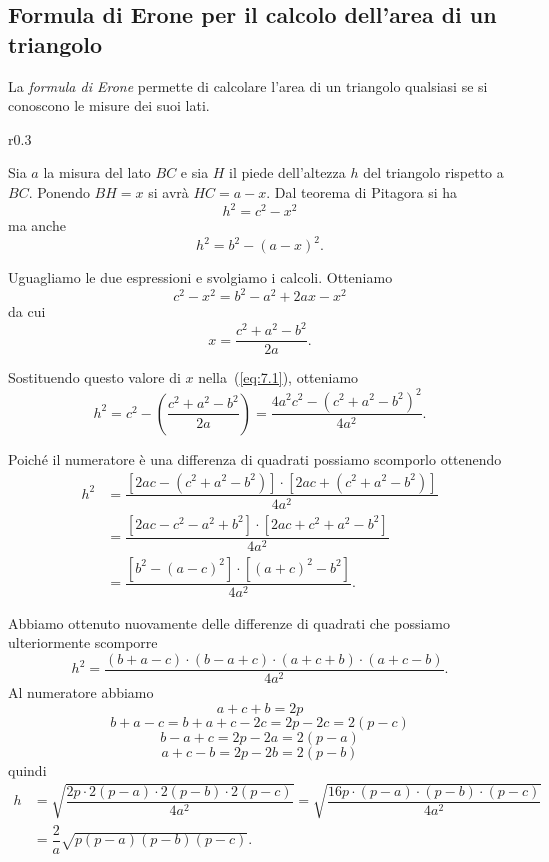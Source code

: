 \subsection{Formula di Erone per il calcolo dell'area di un triangolo}

La \emph{formula di Erone} permette di calcolare l'area di un triangolo qualsiasi se si conoscono le misure dei suoi lati.

\begin{wrapfigure}{r}{0.3\textwidth}
	\centering
	\vspace{10pt}
\end{wrapfigure}
Sia $a$ la misura del lato $BC$ e sia $H$ il piede dell'altezza $h$ del triangolo rispetto a $BC$. Ponendo $BH = x$ si avrà $HC = a - x$.
Dal teorema di Pitagora si ha
\begin{equation}\label{eq:7.1}
h^2=c^2-x^2
\end{equation}
ma anche
\[h^2=b^2-(a-x)^2.\]

Uguagliamo le due espressioni e svolgiamo i calcoli. Otteniamo
\[c^2-x^2=b^2-a^2+2ax-x^2\]
da cui
\[x=\dfrac{c^2+a^2-b^2}{2a}.\]

Sostituendo questo valore di $x$ nella~(\ref{eq:7.1}), otteniamo
\[h^2=c^2-\left(\dfrac{c^2+a^2-b^2}{2a}\right)=\dfrac{4a^2c^2-\left(c^2+a^2-b^2\right)^2}{4a^2}.\]

Poiché il numeratore è una differenza di quadrati possiamo scomporlo ottenendo
\begin{align*}
h^2&=\dfrac{\left[2ac-\left(c^2+a^2-b^2\right)\right]\cdot\left[2ac+\left(c^2+a^2-b^2\right)\right]}{4a^2}\\
&=\dfrac{\left[2ac-c^2-a^2+b^2\right]\cdot\left[2ac+c^2+a^2-b^2\right]}{4a^2}\\
&=\dfrac{\left[b^2-(a-c)^2\right]\cdot\left[(a+c)^2-b^2\right]}{4a^2}.
\end{align*}

Abbiamo ottenuto nuovamente delle differenze di quadrati che possiamo ulteriormente scomporre
\[h^2=\dfrac{(b+a-c)\cdot(b-a+c)\cdot(a+c+b)\cdot(a+c-b)}{4a^2}.\]
Al numeratore abbiamo
\[a + c + b = 2p\]
\[b + a - c = b+a+c-2c = 2p-2c = 2(p-c)\]
\[b - a + c = 2p - 2a = 2 (p - a)\]
\[a + c - b = 2p - 2b = 2(p - b)\]
quindi
\begin{align*}
h&=\sqrt{\dfrac{2p\cdot 2(p-a) \cdot 2(p-b) \cdot 2(p-c)}{4a^2}}=\sqrt{\dfrac{16p\cdot (p-a) \cdot (p-b) \cdot (p-c)}{4a^2}}\\
&=\dfrac{2}{a}\sqrt{p(p-a)(p-b)(p-c)}.
\end{align*}

